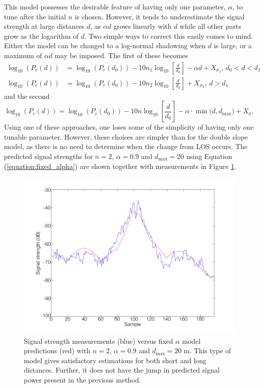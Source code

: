 \documentclass{LTHthesis}
\begin{document}
This model possesses the desirable feature of having only one parameter, $\alpha$, to tune after the initial $n$ is chosen. However, it tends to underestimate the signal strength at large distances $d$, as $\alpha d$ grows linearly with $d$ while all other parts grow as the logarithm of $d$. Two simple ways to correct this easily comes to mind. Either the model can be changed to a log-normal shadowing when $d$ is large, or a maximum of $\alpha d $ may be imposed. The first of these becomes
%
\begin{subequations}
\begin{align}
\log_{10}({P_r(d)})&=\log_{10}({P_r(d_0)})-10n_1\log_{10}\left[{\frac{d}{d_0}}\right] -\alpha d+ X_{\sigma_1}, \hspace{2pt} d_0<d<d_1\\
\log_{10}({P_r(d)})&=\log_{10}({P_r(d_0)})-10n_2\log_{10}\left[{\frac{d}{d_0}}\right] + X_{\sigma_2}, \hspace{2pt} d>d_1
\end{align}
\end{subequations} 
and the second
\begin{equation}
\log_{10}({P_r(d)})=\log_{10}({P_r(d_0)})-10n\log_{10}\left[{\frac{d}{d_0}}\right] - \alpha\cdot\min({d, d_{\text{max}})}+ X_\sigma.
\label{equation:fixed_alpha}
\end{equation}
%
Using one of these approaches, one loses some of the simplicity of having only one tunable parameter. However, these choices are simpler than for the double slope model, as there is no need to determine when the change from LOS occurs. 
 The predicted signal strengths for $n=2$, $\alpha=0.9$ and $d_{\text{max}}=20$  using Equation (\ref{equation:fixed_alpha}) are shown together with measurements in Figure \ref{fixed_alpha}. 
 \begin{figure}[!hbt]

\includegraphics[width=1\textwidth ]{images/signal_model/fixed_alpha}
\caption{Signal strength measurements (blue) versus fixed $\alpha$ model predictions (red) with $n=2$, $\alpha=0.9$ and $d_{\text{max}}=20$ m. This type of model gives satisfactory estimations for both short and long distances. Further, it does not have the jump in predicted signal power present in the previous method.}\label{fixed_alpha}
\end{figure}
\end{document}

